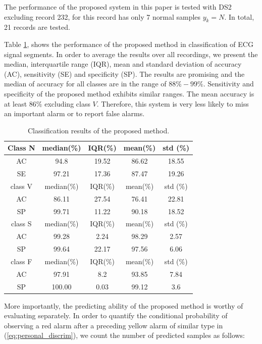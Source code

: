 The performance of the proposed system in this paper is tested with DS2 excluding record 232, for this record has only 7 normal samples $y_k=N$. In total, 21 records are tested.

Table \ref{table:result1}, shows the performance of the proposed method in classification of ECG signal segments. In order to average the results over all recordings, we present the median, interquartile range (IQR), mean and standard deviation of accuracy (AC), sensitivity (SE) and specificity (SP). The results are promising and the median of accuracy for all classes are in the range of $88\%-99\%$. Sensitivity and specificity of the proposed method exhibits similar ranges. The mean accuracy is at least $86\%$ excluding class $V$. Therefore, this system is very less likely to miss an important alarm or to report false alarms. 

\begin{table}[thpb]
	\caption{Classification results of the proposed method.}
	\centering
	\begin{tabular}{|c||c||c||c||c|}
		\hline
		Class N & median(\%) & IQR(\%) & mean(\%)& std (\%) \\ 
		\hline 
		AC & 94.8& 19.52 & 86.62 & 18.55\\ 
		\hline 
		SE & 97.21  & 17.36 & 87.47 &19.26 \\ 
		\hline 
		class V & median(\%) & IQR(\%) & mean(\%)& std (\%) \\ 
		\hline 
		AC & 86.11 & 27.54 & 76.41 & 22.81 \\ 
		\hline 
		SP & 99.71 & 11.22 & 90.18 & 18.52 \\ 
		\hline 
		class S & median(\%) & IQR(\%) & mean(\%)& std (\%)\\ 
		\hline 
		AC & 99.28 & 2.24& 98.29&2.57 \\ 
		\hline 
		SP & 99.64& 22.17& 97.56 & 6.06\\ 
		\hline 
		class F & median(\%) & IQR(\%) & mean(\%)& std (\%) \\ 
		\hline 
		AC & 97.91 & 8.2&93.85&7.84\\ 
		\hline 
		SP & 100.00 & 0.03&99.12&3.6\\ 
		\hline 
		\hline
	\end{tabular} 
	\label{table:result1}
\end{table}

More importantly, the predicting ability of the proposed method is worthy of evaluating separately. In order to quantify the conditional probability of observing a red alarm after a preceding yellow alarm of similar type in (\ref{eq:personal_discrim}), we count the number of predicted samples as follows:

